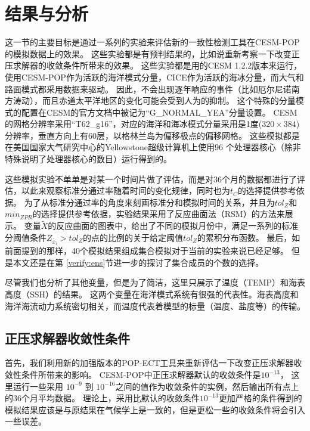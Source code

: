 \section{结果与分析} \label{verify:exp}

 
这一节的主要目标是通过一系列的实验来评估新的一致性检测工具在CESM-POP的模拟数据上的效果。
这些实验都是有预判结果的，比如说重新考察一下改变正压求解器的收敛条件所带来的效果。
这些实验都是用的CESM 1.2.2版本来运行，使用CESM-POP作为活跃的海洋模式分量，CICE作为活跃的海冰分量，而大气和路面模式都采用数据来驱动。
因此，不会出现逐年响应的事件（比如厄尔尼诺南方涛动），而且赤道太平洋地区的变化可能会受到人为的抑制。
这个特殊的分量模式的配置在CESM的官方文档中被记为“G\_NORMAL\_YEA”分量设置。
CESM的网格分辨率采用“T62\_g16”，对应的海洋和海冰模式分量采用是1度($320 \times 384$)分辨率，垂直方向上有60层，以格林兰岛为偏移极点的偏移网格。 
这些模拟都是在美国国家大气研究中心的Yellowstone超级计算机上使用$96$ 个处理器核心（除非特殊说明了处理器核心的数目）运行得到的。 

这些模拟实验不单单是对某一个时间片做了评估，而是对36个月的数据都进行了评估，以此来观察标准分通过率随着时间的变化规律，同时也为$t_C$的选择提供参考依据。
为了从标准分通过率的角度来刻画标准分和模拟时间的关系，并且为$tol_{Z}$和$min_{ZPR}$的选择提供参考依据，实验结果采用了反应曲面法（RSM）\cite{box2007}的方法来展示。 
变量$\tilde{X}$的反应曲面的图表中，给出了不同的模拟月份中，满足一系列的标准分阈值条件$Z_{\tilde{x_i}} > tol_{Z}$的点的比例的关于给定阈值$tol_{Z}$的累积分布函数。
最后，如前面提到的那样，40个模拟结果组成集合模拟对于当前的实验来说已经足够。
但是本文还是在第 \ref{verify:ens}节进一步的探讨了集合成员的个数的选择。  

尽管我们也分析了其他变量，但是为了简洁，这里只展示了温度（TEMP）和海表高度（SSH）的结果。 
这两个变量在海洋模式系统有很强的代表性。海表高度和海洋海流动力系统密切相关，而温度代表着模型的标量（温度、盐度等）的传输。
 

\subsection{正压求解器收敛性条件}
\label{verify:ECT:baroSolver}

 
首先，我们利用新的加强版本的POP-ECT工具来重新评估一下改变正压求解器收敛性条件所带来的影响。
CESM-POP中正压求解器默认的收敛条件是$10^{-13}$， 这里运行一些采用 $10^{-9}$ 到 $10^{-16}$之间的值作为收敛条件的实例，然后输出所有点上的36个月平均数据。
理论上，采用比默认的收敛条件$10^{-13}$更加严格的条件得到的模拟结果应该是与原结果在气候学上是一致的，但是更松一些的收敛条件将会引入一些误差。


